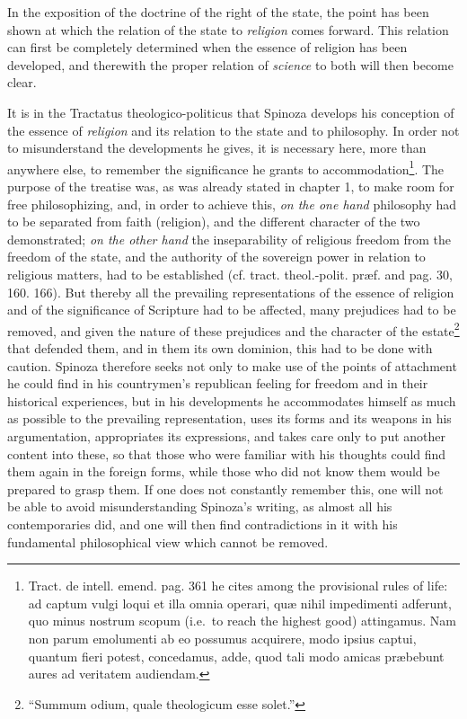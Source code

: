 \documentclass[12pt,a4paper,openany]{book}
\newcommand{\opage}[1]{\marginnote{\footnotesize\textit{[#1]}}}
\begin{document}
In the exposition of the doctrine of the right of the state, the point has been shown at which the relation of the state to \emph{religion} comes forward. This relation can first be completely determined when the essence of religion has been developed, and therewith the proper relation of \emph{science} to both will then become clear.

It is in the Tractatus theologico-politicus that Spinoza develops his conception of the essence of \emph{religion} and its relation to the state and to philosophy. In order not to misunderstand the developments he gives, it is necessary here, more than anywhere else, to remember the significance he grants to accommodation\footnote{Tract. de intell. emend. pag. 361 he cites among the provisional rules of life: ad captum vulgi loqui et illa omnia operari, quæ nihil impedimenti adferunt, quo minus nostrum scopum (i.e.\ to reach the highest good) attingamus. Nam non parum emolumenti ab eo possumus acquirere, modo ipsius captui, quantum fieri potest, concedamus, adde, quod tali modo amicas præbebunt aures ad veritatem audiendam.}. The purpose of the treatise was, as was already stated in chapter 1, to make room for free philosophizing, and, in order to achieve this, \emph{on the one hand} philosophy had to be separated from faith (religion), and the different character of the two demonstrated; \emph{on the other hand} the inseparability of religious freedom from the freedom of the state, and the authority of the sovereign power in relation to religious matters, had to be established (cf. tract. theol.-polit. præf. and pag. 30, 160. 166). But thereby all the prevailing representations of the essence of religion
\opage{147}\setcounter{footnote}{0}and of the significance of Scripture had to be affected, many prejudices had to be removed, and given the nature of these prejudices and the character of the estate\footnote{``Summum odium, quale theologicum esse solet.''} that defended them, and in them its own dominion, this had to be done with caution. Spinoza therefore seeks not only to make use of the points of attachment he could find in his countrymen's republican feeling for freedom and in their historical experiences, but in his developments he accommodates himself as much as possible to the prevailing representation, uses its forms and its weapons in his argumentation, appropriates its expressions, and takes care only to put another content into these, so that those who were familiar with his thoughts could find them again in the foreign forms, while those who did not know them would be prepared to grasp them. If one does not constantly remember this, one will not be able to avoid misunderstanding Spinoza's writing, as almost all his contemporaries did, and one will then find contradictions in it with his fundamental philosophical view which cannot be removed.
\end{document}
